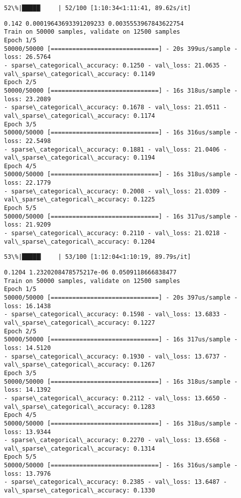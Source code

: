 \documentclass[11pt]{article}
\begin{document}
    \begin{Verbatim}[commandchars=\\\{\}]
 52\%|█████▏    | 52/100 [1:10:34<1:11:41, 89.62s/it]
    \end{Verbatim}

    \begin{Verbatim}[commandchars=\\\{\}]
0.142 0.00019643693391209233 0.0035553967843622754
Train on 50000 samples, validate on 12500 samples
Epoch 1/5
50000/50000 [==============================] - 20s 399us/sample - loss: 26.5764
- sparse\_categorical\_accuracy: 0.1250 - val\_loss: 21.0635 -
val\_sparse\_categorical\_accuracy: 0.1149
Epoch 2/5
50000/50000 [==============================] - 16s 318us/sample - loss: 23.2089
- sparse\_categorical\_accuracy: 0.1678 - val\_loss: 21.0511 -
val\_sparse\_categorical\_accuracy: 0.1174
Epoch 3/5
50000/50000 [==============================] - 16s 316us/sample - loss: 22.5498
- sparse\_categorical\_accuracy: 0.1881 - val\_loss: 21.0406 -
val\_sparse\_categorical\_accuracy: 0.1194
Epoch 4/5
50000/50000 [==============================] - 16s 318us/sample - loss: 22.1779
- sparse\_categorical\_accuracy: 0.2008 - val\_loss: 21.0309 -
val\_sparse\_categorical\_accuracy: 0.1225
Epoch 5/5
50000/50000 [==============================] - 16s 317us/sample - loss: 21.9209
- sparse\_categorical\_accuracy: 0.2110 - val\_loss: 21.0218 -
val\_sparse\_categorical\_accuracy: 0.1204
    \end{Verbatim}

    \begin{Verbatim}[commandchars=\\\{\}]
 53\%|█████▎    | 53/100 [1:12:04<1:10:19, 89.79s/it]
    \end{Verbatim}

    \begin{Verbatim}[commandchars=\\\{\}]
0.1204 1.2320208478575217e-06 0.0509118666838477
Train on 50000 samples, validate on 12500 samples
Epoch 1/5
50000/50000 [==============================] - 20s 397us/sample - loss: 16.1438
- sparse\_categorical\_accuracy: 0.1598 - val\_loss: 13.6833 -
val\_sparse\_categorical\_accuracy: 0.1227
Epoch 2/5
50000/50000 [==============================] - 16s 317us/sample - loss: 14.5120
- sparse\_categorical\_accuracy: 0.1930 - val\_loss: 13.6737 -
val\_sparse\_categorical\_accuracy: 0.1267
Epoch 3/5
50000/50000 [==============================] - 16s 318us/sample - loss: 14.1392
- sparse\_categorical\_accuracy: 0.2112 - val\_loss: 13.6650 -
val\_sparse\_categorical\_accuracy: 0.1283
Epoch 4/5
50000/50000 [==============================] - 16s 318us/sample - loss: 13.9344
- sparse\_categorical\_accuracy: 0.2270 - val\_loss: 13.6568 -
val\_sparse\_categorical\_accuracy: 0.1314
Epoch 5/5
50000/50000 [==============================] - 16s 316us/sample - loss: 13.7976
- sparse\_categorical\_accuracy: 0.2385 - val\_loss: 13.6487 -
val\_sparse\_categorical\_accuracy: 0.1330
    \end{Verbatim}
\end{document}
